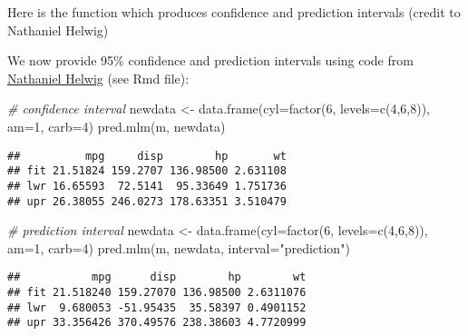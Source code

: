 \documentclass[
  ignorenonframetext,
]{beamer}
\newenvironment{Shaded}{\begin{snugshade}}{\end{snugshade}}
\newcommand{\AttributeTok}[1]{\textcolor[rgb]{0.77,0.63,0.00}{#1}}
\newcommand{\CommentTok}[1]{\textcolor[rgb]{0.56,0.35,0.01}{\textit{#1}}}
\newcommand{\DecValTok}[1]{\textcolor[rgb]{0.00,0.00,0.81}{#1}}
\newcommand{\FunctionTok}[1]{\textcolor[rgb]{0.00,0.00,0.00}{#1}}
\newcommand{\NormalTok}[1]{#1}
\newcommand{\OtherTok}[1]{\textcolor[rgb]{0.56,0.35,0.01}{#1}}
\newcommand{\StringTok}[1]{\textcolor[rgb]{0.31,0.60,0.02}{#1}}
\begin{document}
\begin{frame}[fragile]{}
\protect\hypertarget{section-8}{}
Here is the function which produces confidence and prediction intervals
(credit to Nathaniel Helwig)

We now provide 95\% confidence and prediction intervals using code from
\href{http://users.stat.umn.edu/~helwig/notes/mvlr-Notes.pdf}{Nathaniel
Helwig} (see Rmd file):

\vspace{12pt}
\tiny

\begin{Shaded}
\begin{Highlighting}[]
\CommentTok{\# confidence interval}
\NormalTok{newdata }\OtherTok{\textless{}{-}} \FunctionTok{data.frame}\NormalTok{(}\AttributeTok{cyl=}\FunctionTok{factor}\NormalTok{(}\DecValTok{6}\NormalTok{, }\AttributeTok{levels=}\FunctionTok{c}\NormalTok{(}\DecValTok{4}\NormalTok{,}\DecValTok{6}\NormalTok{,}\DecValTok{8}\NormalTok{)), }\AttributeTok{am=}\DecValTok{1}\NormalTok{, }\AttributeTok{carb=}\DecValTok{4}\NormalTok{)}
\FunctionTok{pred.mlm}\NormalTok{(m, newdata)}
\end{Highlighting}
\end{Shaded}

\begin{verbatim}
##          mpg     disp        hp       wt
## fit 21.51824 159.2707 136.98500 2.631108
## lwr 16.65593  72.5141  95.33649 1.751736
## upr 26.38055 246.0273 178.63351 3.510479
\end{verbatim}

\begin{Shaded}
\begin{Highlighting}[]
\CommentTok{\# prediction interval}
\NormalTok{newdata }\OtherTok{\textless{}{-}} \FunctionTok{data.frame}\NormalTok{(}\AttributeTok{cyl=}\FunctionTok{factor}\NormalTok{(}\DecValTok{6}\NormalTok{, }\AttributeTok{levels=}\FunctionTok{c}\NormalTok{(}\DecValTok{4}\NormalTok{,}\DecValTok{6}\NormalTok{,}\DecValTok{8}\NormalTok{)), }\AttributeTok{am=}\DecValTok{1}\NormalTok{, }\AttributeTok{carb=}\DecValTok{4}\NormalTok{)}
\FunctionTok{pred.mlm}\NormalTok{(m, newdata, }\AttributeTok{interval=}\StringTok{"prediction"}\NormalTok{)}
\end{Highlighting}
\end{Shaded}

\begin{verbatim}
##           mpg      disp        hp        wt
## fit 21.518240 159.27070 136.98500 2.6311076
## lwr  9.680053 -51.95435  35.58397 0.4901152
## upr 33.356426 370.49576 238.38603 4.7720999
\end{verbatim}
\end{frame}
\end{document}
